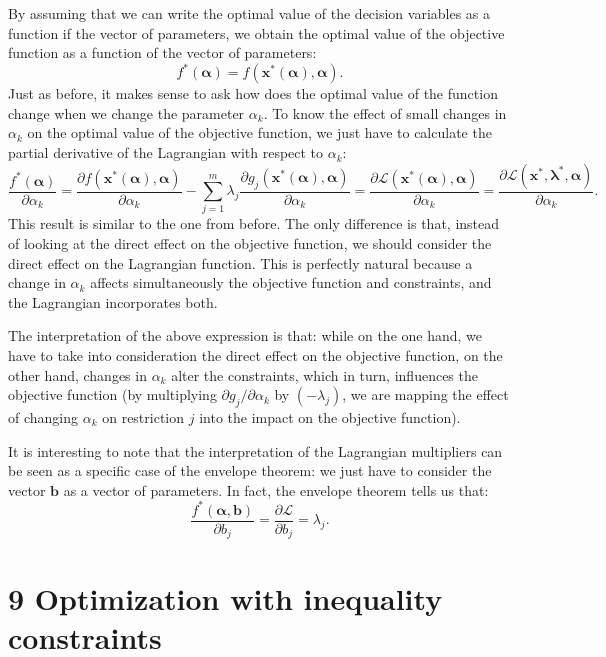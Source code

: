 \documentclass[0pt, a4paper]{article}
\newcommand{\Lagr}{\mathcal{L}}
\begin{document}
By assuming that we can write the optimal value of the decision variables as a function if the vector of parameters, we obtain the optimal value of the objective function as a function of the vector of parameters: $$f^*(\boldsymbol{\alpha})=f(\textbf{x}^*(\boldsymbol{\alpha}),\boldsymbol{\alpha}).$$
Just as before, it makes sense to ask how does the optimal value of the function change when we change the parameter $\alpha_k$. To know the effect of small changes in $\alpha_k$ on the optimal value of the objective function, we just have to calculate the partial derivative of the Lagrangian with respect to $\alpha_k$:
$$\frac{f^*(\boldsymbol{\alpha})}{\partial \alpha_k}=\frac{\partial f(\textbf{x}^*(\boldsymbol{\alpha}),\boldsymbol{\alpha})}{\partial \alpha_k}-\sum_{j=1}^{m}\lambda_j\frac{\partial g_j(\textbf{x}^*(\boldsymbol{\alpha}),\boldsymbol{\alpha})}{\partial \alpha_k}=\frac{\partial \Lagr(\textbf{x}^*(\boldsymbol{\alpha}),\boldsymbol{\alpha})}{\partial \alpha_k}=\frac{\partial \Lagr(\textbf{x}^*,\boldsymbol{\lambda}^*,\boldsymbol{\alpha})}{\partial \alpha_k}.$$
This result is similar to the one from before. The only difference is that, instead of looking at the direct effect on the objective function, we should consider the direct effect on the Lagrangian function. This is perfectly natural because a change in $\alpha_k$ affects simultaneously the objective function and constraints, and the Lagrangian incorporates both.

The interpretation of the above expression is that: while on the one hand, we have to take into consideration the direct effect on the objective function, on the other hand, changes in $\alpha_k$ alter the constraints, which in turn, influences the objective function (by multiplying $ \partial g_j/\partial\alpha_k$ by $(-\lambda_j)$, we are mapping the effect of changing $\alpha_k$ on restriction $j$ into the impact on the objective function).

It is interesting to note that the interpretation of the Lagrangian multipliers can be seen as a specific case of the envelope theorem: we just have to consider the vector $\textbf{b}$ as a vector of parameters. In fact, the envelope theorem tells us that:
$$\frac{f^*(\boldsymbol{\alpha},\textbf{b})}{\partial b_j}=\frac{\partial \Lagr}{\partial b_j}=\lambda_j.$$

\clearpage

\section*{9 Optimization with inequality constraints}
\end{document}
